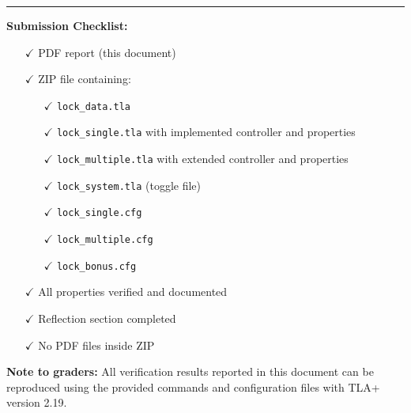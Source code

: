 \documentclass[12pt,a4paper]{article}
\begin{document}
\vspace{1cm}

\noindent\rule{\textwidth}{0.4pt}

\textbf{Submission Checklist:}

\begin{itemize}
    \item[$\checkmark$] PDF report (this document)
    \item[$\checkmark$] ZIP file containing:
    \begin{itemize}
        \item[$\checkmark$] \texttt{lock\_data.tla}
        \item[$\checkmark$] \texttt{lock\_single.tla} with implemented controller and properties
        \item[$\checkmark$] \texttt{lock\_multiple.tla} with extended controller and properties
        \item[$\checkmark$] \texttt{lock\_system.tla} (toggle file)
        \item[$\checkmark$] \texttt{lock\_single.cfg}
        \item[$\checkmark$] \texttt{lock\_multiple.cfg}
        \item[$\checkmark$] \texttt{lock\_bonus.cfg}
    \end{itemize}
    \item[$\checkmark$] All properties verified and documented
    \item[$\checkmark$] Reflection section completed
    \item[$\checkmark$] No PDF files inside ZIP
\end{itemize}

\vspace{0.5cm}

\textbf{Note to graders:} All verification results reported in this document can be reproduced using the provided commands and configuration files with TLA+ version 2.19.
\end{document}
